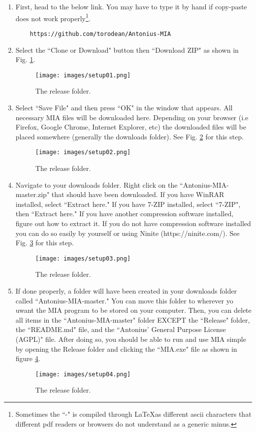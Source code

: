 \begin{enumerate}
	\item First, head to the below link. You may have to type it by hand if copy-paste does not work properly\footnote{Sometimes the ``-" is compiled through \LaTeX as different ascii characters that different pdf readers or browsers do not understand as a generic minus.}.

	\begin{lstlisting}
	https://github.com/torodean/Antonius-MIA
	\end{lstlisting}
	
	\item Select the ``Clone or Download" button then ``Download ZIP" as shown in Fig. \ref{setup01}.
	
	\begin{figure}[h]
		\centering
		\texttt{[image: images/setup01.png]}
		\caption{The release folder.} \label{setup01}
	\end{figure}
	
	\item Select ``Save File" and then press ``OK" in the window that appears. All necessary MIA files will be downloaded here. Depending on your browser (i.e Firefox, Google Chrome, Internet Explorer, etc) the downloaded files will be placed somewhere (generally the downloads folder). See Fig. \ref{setup02} for this step.
	
	\begin{figure}[h]
		\centering
		\texttt{[image: images/setup02.png]}
		\caption{The release folder.} \label{setup02}
	\end{figure}
	
	\item Navigate to your downloads folder. Right click on the ``Antonius-MIA-master.zip" that should have been downloaded. If you have WinRAR installed, select ``Extract here." If you have 7-ZIP installed, select ``7-ZIP", then ``Extract here." If you have another compression software installed, figure out how to extract it. If you do not have compression software installed you can do so easily by yourself or using Ninite (https://ninite.com/). See Fig. \ref{setup03} for this step.
	
	\begin{figure}[h]
		\centering
		\texttt{[image: images/setup03.png]}
		\caption{The release folder.} \label{setup03}
	\end{figure}

	\item If done properly, a folder will have been created in your downloads folder called ``Antonius-MIA-master." You can move this folder to wherever yo uwant the MIA program to be stored on your computer. Then, you can delete all items in the ``Antonius-MIA-master" folder EXCEPT the ``Release" folder, the ``README.md" file, and the ``Antonius’ General Purpose License (AGPL)" file. After doing so, you should be able to run and use MIA simple by opening the Release folder and clicking the ``MIA.exe" file as shown in figure \ref{setup04}.
	
	\begin{figure}[h]
		\centering
		\texttt{[image: images/setup04.png]}
		\caption{The release folder.} \label{setup04}
	\end{figure}

\end{enumerate}